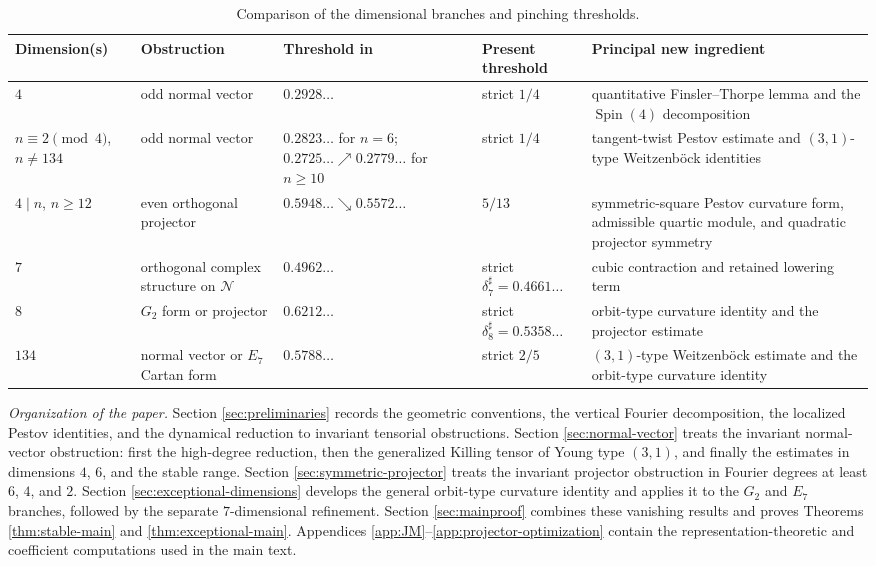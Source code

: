 \documentclass[reqno,11pt]{amsart}
\theoremstyle{definition}
\newcommand{\cN}{\mathcal N}
\newcommand{\Spin}{\operatorname{Spin}}
\begin{document}
\begin{table}[!ht]
\centering
\footnotesize
\setlength{\tabcolsep}{3pt}
\renewcommand{\arraystretch}{1.18}
\begin{tabularx}{\textwidth}{@{}
  >{\raggedright\arraybackslash}p{0.82in}
  >{\raggedright\arraybackslash}p{0.92in}
  >{\raggedright\arraybackslash}p{1.08in}
  >{\raggedright\arraybackslash}p{0.82in}
  >{\raggedright\arraybackslash}X@{}}
\hline
Dimension(s) & Obstruction & Threshold in \cite{CLMS24} & Present threshold & Principal new ingredient \\
\hline
$4$ & odd normal vector & $0.2928\ldots$ & strict $1/4$ & quantitative Finsler--Thorpe lemma and the $\Spin(4)$ decomposition \\
$n\equiv2\pmod4$, $n\neq134$ & odd normal vector & $0.2823\ldots$ for $n=6$; $0.2725\ldots\nearrow0.2779\ldots$ for $n\geq10$ & strict $1/4$ & tangent-twist Pestov estimate and $(3,1)$-type Weitzenb\"ock identities \\
$4\mid n$, $n\geq12$ & even orthogonal projector & $0.5948\ldots\searrow0.5572\ldots$ & $5/13$ & symmetric-square Pestov curvature form, admissible quartic module, and quadratic projector symmetry \\
$7$ & orthogonal complex structure on $\cN$ & $0.4962\ldots$ & strict $\delta_7^\sharp=0.4661\ldots$ & cubic contraction and retained lowering term \\
$8$ & $G_2$ form or projector & $0.6212\ldots$ & strict $\delta_8^\sharp=0.5358\ldots$ & orbit-type curvature identity and the projector estimate \\
$134$ & normal vector or $E_7$ Cartan form & $0.5788\ldots$ & strict $2/5$ & $(3,1)$-type Weitzenb\"ock estimate and the orbit-type curvature identity \\
\hline
\end{tabularx}
\caption{Comparison of the dimensional branches and pinching thresholds.}
\label{tab:comparison}
\end{table}

\medskip
\noindent\emph{Organization of the paper.}
Section \ref{sec:preliminaries} records the geometric conventions, the vertical
Fourier decomposition, the localized Pestov identities, and the dynamical
reduction to invariant tensorial obstructions.  Section \ref{sec:normal-vector}
treats the invariant normal-vector obstruction: first the high-degree
reduction, then the generalized Killing tensor of Young type $(3,1)$, and
finally the estimates in dimensions $4$, $6$, and the stable range.  Section
\ref{sec:symmetric-projector} treats the invariant projector obstruction in
Fourier degrees at least $6$, $4$, and $2$.  Section
\ref{sec:exceptional-dimensions} develops the general orbit-type curvature
identity and applies it to the $G_2$ and $E_7$ branches, followed by the
separate $7$-dimensional refinement.  Section \ref{sec:mainproof} combines
these vanishing results and proves Theorems \ref{thm:stable-main} and
\ref{thm:exceptional-main}.  Appendices \ref{app:JM}--\ref{app:projector-optimization}
contain the representation-theoretic and coefficient computations used in
the main text.
\end{document}

